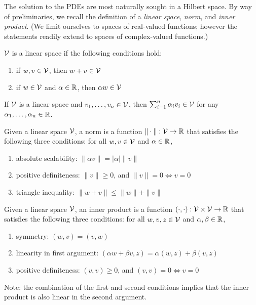 The solution to the PDEs are most naturally sought in a Hilbert space. By way of preliminaries, we recall the definition of a \emph{linear space}, \emph{norm}, and \emph{inner product}. (We limit ourselves to spaces of real-valued functions; however the statements readily extend to spaces of complex-valued functions.)
\begin{definition}
  $\mathcal{V}$ is a linear space if the following conditions hold:
  \begin{enumerate}
  \item if $w,v \in \mathcal{V}$, then $w + v \in \mathcal{V}$
  \item if $w \in \mathcal{V}$ and $\alpha \in \mathbb{R}$, then $\alpha w \in \mathcal{V}$
  \end{enumerate}
\end{definition}
\begin{remark}
  If $\mathcal{V}$ is a linear space and $v_1,\dots,v_n \in \mathcal{V}$, then $\sum_{i=1}^n \alpha_i v_i \in \mathcal{V}$ for any $\alpha_1, \dots, \alpha_n \in \mathbb{R}$.
\end{remark}
\begin{definition}[norm]
  Given a linear space $\mathcal{V}$, a norm is a function $\| \cdot \| : \mathcal{V} \to \mathbb{R}$ that satisfies the following three conditions: for all $w,v \in \mathcal{V}$ and $\alpha \in \mathbb{R}$, 
  \begin{enumerate}
  \item absolute scalability: $\| \alpha v \| = |\alpha| \| v \|$
  \item positive definiteness: $ \| v \| \geq 0$,  and $\| v \| = 0 \Leftrightarrow v = 0$
  \item triangle inequality: $  \| w + v \| \leq \| w \| + \| v \| $
  \end{enumerate}
\end{definition}
\begin{definition}
  Given a linear space $\mathcal{V}$, an inner product is a function $(\cdot,\cdot): \mathcal{V} \times \mathcal{V} \to \mathbb{R}$ that satisfies the following three conditions: for all $w,v,z \in \mathcal{V}$ and $\alpha,\beta \in \mathbb{R}$,
\begin{enumerate}
\item symmetry: $(w,v) = (v,w)$
\item linearity in first argument: $ (\alpha w + \beta v, z) = \alpha (w,z) + \beta (v,z)$
\item positive definiteness: $ (v,v) \geq 0$, and $(v,v) = 0 \Leftrightarrow v = 0 $
\end{enumerate}
Note: the combination of the first and second conditions implies that the inner product is also linear in the second argument.
\end{definition}
